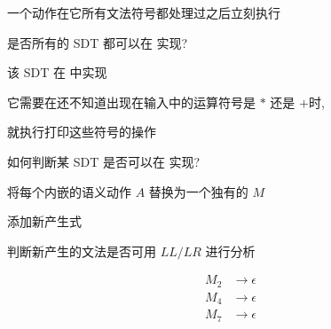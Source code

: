 \begin{frame}{}
  
\end{frame}

\begin{frame}{}
  \begin{center}
     一个动作在它所有文法符号都处理过之后立刻执行

    \vspace{0.30cm}

    \vspace{0.60cm}
     是否所有的 SDT 都可以在 实现?
  \end{center}
\end{frame}

\begin{frame}{}
  \begin{center}
    该 SDT 在  中实现


    \pause
    \vspace{0.50cm}
    它需要在还不知道出现在输入中的运算符号是 $\ast$ 还是 $+$时,

    \vspace{0.30cm}
    就执行打印这些符号的操作
  \end{center}
\end{frame}

\begin{frame}{}
  \begin{center}
     如何判断某 SDT 是否可以在 实现?

    \pause
    \vspace{1.20cm}
    将每个内嵌的语义动作 $A$ 替换为一个独有的 $M$

    \vspace{0.60cm}
    添加新产生式 

    \vspace{0.60cm}
    判断新产生的文法是否可用 $LL/LR$ 进行分析
  \end{center}
\end{frame}

\begin{frame}{}
  \begin{center}

    \begin{align*}
      M_{2} &\to \epsilon \\
      M_{4} &\to \epsilon \\
      M_{7} &\to \epsilon
    \end{align*}
  \end{center}
\end{frame}

